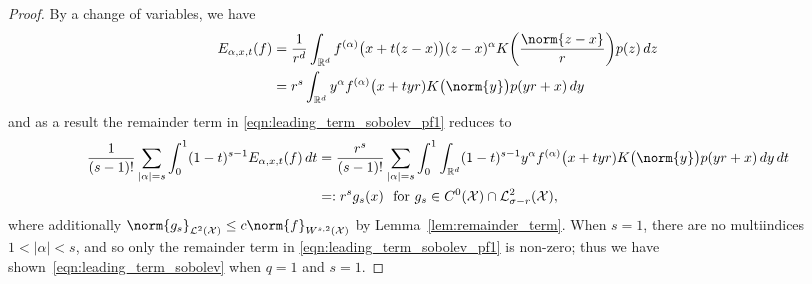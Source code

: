 \documentclass{article}
\newcommand{\Reals}{\mathbb{R}}
\newcommand{\abs}[1]{\left \lvert #1 \right \rvert}
\newcommand{\1}{\mathbf{1}}
\newcommand{\Rd}{\Reals^d}
\newcommand{\Xset}{\mathcal{X}}
\newcommand{\Leb}{\mathcal{L}}
\theoremstyle{alden}
\theoremstyle{aldenthm}
\theoremstyle{definition}
\theoremstyle{remark}
\begin{document}
\begin{proof}
	By a change of variables, we have
	\begin{align*}
	E_{\alpha,x,t}(f) & = \frac{1}{r^d}\int_{\Rd} f^{(\alpha)}\bigl(x + t(z - x)\bigr) (z - x)^{\alpha}  K\biggl(\frac{\norm{z - x}}{r}\biggr) p(z) \,dz \\
	& = r^s \int_{\Rd} y^{\alpha} f^{(\alpha)}\bigl(x + tyr) K\bigl(\norm{y}\bigr) p(yr + x) \,dy
	\end{align*}
	and as a result the remainder term in \eqref{eqn:leading_term_sobolev_pf1} reduces to
	\begin{align*}
	\frac{1}{(s - 1)!}\sum_{\abs{\alpha} = s} \int_{0}^{1}(1 - t)^{s - 1} E_{\alpha,x,t}(f)  \,dt & = \frac{r^s}{(s - 1)!}\sum_{\abs{\alpha} = s} \int_{0}^{1} \int_{\Rd} (1 - t)^{s - 1}  y^{\alpha} f^{(\alpha)}\bigl(x + tyr) K\bigl(\norm{y}\bigr) p(yr + x) \,dy \,dt \\
	& =: r^s g_s(x) ~~\textrm{for $g_s \in C^{0}(\Xset) \cap \Leb_{\sigma - r}^2(\Xset)$},
	\end{align*}
	where additionally $\norm{g_s}_{\Leb^2(\Xset)} \leq c \norm{f}_{W^{s,2}(\Xset)}$ by Lemma~\ref{lem:remainder_term}. When $s = 1$, there are no multiindices $1 < \abs{\alpha} < s$, and so only the remainder term in \eqref{eqn:leading_term_sobolev_pf1} is non-zero; thus we have shown~\eqref{eqn:leading_term_sobolev} when $q = 1$ and $s = 1$.
	

\end{proof}
\end{document}
